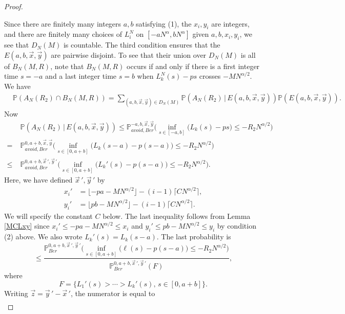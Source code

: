 \begin{proof}
\begin{enumerate}[label=(\arabic*)]
		\end{enumerate} 
		Since there are finitely many integers $a,b$ satisfying (1), the $x_i,y_i$ are integers, and there are finitely many choices of $L_i^N$ on $[-aN^\alpha, bN^\alpha]$ given $a,b,x_i,y_i$, we see that $D_N(M)$ is countable. The third condition ensures that the $E(a,b,\vec{x},\vec{y})$ are pairwise disjoint. To see that their union over $D_N(M)$ is all of $B_N(M,R)$, note that $B_N(M,R)$ occurs if and only if there is a first integer time $s=-a$ and a last integer time $s=b$ when $L_k^N(s)-ps$ crosses $-MN^{\alpha/2}$. We have
		\begin{align*}
		&\mathbb{P}(A_N(R_2) \cap B_N(M,R)) = \sum_{(a,b,\vec{x},\vec{y})\in D_N(M)} \mathbb{P}(A_N(R_2)\,|\,E(a,b,\vec{x},\vec{y}))\mathbb{P}(E(a,b,\vec{x},\vec{y})).
		\end{align*}
		Now
		\begin{align}
		&\mathbb{P}(A_N(R_2)\,|\,E(a,b,\vec{x},\vec{y})) \leq \mathbb{P}^{-a,b, \vec{x}, \vec{y}}_{avoid, Ber} \Big( \inf_{s\in[-a, b]} \big(L_k(s) - ps\big) \leq -R_2N^{\alpha/2} \Big) \label{4.3main}\\
		= \; & \mathbb{P}^{0, a+b, \vec{x}, \vec{y}}_{avoid, Ber} \Big( \inf_{s\in[0,a+b]} \big(L_k(s-a) - p(s-a)\big) \leq -R_2N^{\alpha/2} \Big) \nonumber\\
		\leq \; & \mathbb{P}^{0, a+b, \vec{x}\,', \vec{y}\,'}_{avoid, Ber} \Big( \inf_{s\in[0,a+b]} \big(L_k'(s) - p(s-a)\big) \leq -R_2N^{\alpha/2} \Big) \nonumber.
		\end{align}
		Here, we have defined $\vec{x}\,',\vec{y}\,'$ by
		\begin{align*}
		x_i' &= \lfloor - pa - MN^{\alpha/2}\rfloor - (i-1)\lceil CN^{\alpha/2}\rceil,\\
		y_i' &= \lfloor pb - MN^{\alpha/2}\rfloor - (i-1)\lceil CN^{\alpha/2}\rceil.
		\end{align*} 
		We will specify the constant $C$ below. The last inequality follows from Lemma \ref{MCLxy} since $x_i' \leq -pa - MN^{\alpha/2} \leq x_i$ and $y_i' \leq pb - MN^{\alpha/2} \leq y_i$ by condition (2) above. We also wrote $L_k'(s) = L_k(s-a)$. The last probability is
		\[
		\leq \frac{\mathbb{P}^{0, a+b, \vec{x}\,', \vec{y}\,'}_{Ber} \Big( \inf_{s\in[0,a+b]} \big(\ell(s) - p(s-a)\big) \leq -R_2 N^{\alpha/2} \Big)}{\mathbb{P}^{0, a+b, \vec{x}\,', \vec{y}\,'}_{Ber}(F)},
		\]
		where
		\[
		F = \{L_1'(s) > \cdots > L_k'(s), \,s\in [0, a+b]\}.
		\]
		Writing $\vec{z} = \vec{y}\,' - \vec{x}\,'$, the numerator is equal to
		\begin{align*}

\end{align*}
\end{proof}
